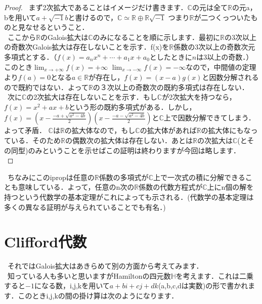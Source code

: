 \documentclass[./main]{subfiles} %
\theoremstyle{idefinition}
\begin{document}
\begin{proof}
\ まず2次拡大であることはイメージだけ書きます．$\mathbb{C}$の元は全て$\mathbb{R}$の元a，bを用いて$a+\sqrt{-1} b$と書けるので，$\mathbb{C} \simeq \mathbb{R} \oplus \mathbb{R} \sqrt{-1}$ つまり$\mathbb{R}$が二つくっついたものと見なせるということ．\\
\ ここから$\mathbb{R}$のGalois拡大は$\mathbb{C}$のみになることを順に示します．最初に$\mathbb{R}$の3次以上の奇数次Galois拡大は存在しないことを示す．f(x)を$\mathbb{R}$係数の3次以上の奇数次元多項式とする．（$f(x)=a_nx^n+\cdots +a_1x+a_0$としたときに$n$は3以上の奇数．）このとき$\displaystyle \lim_{x \to +\infty} f(x)=+\infty$ $\displaystyle \lim_{x \to -\infty} f(x)=-\infty$なので，中間値の定理より$f(a)=0$となる$a\in \mathbb{R}$が存在し，$f(x)=(x-a)g(x)$と因数分解されるので既約ではない．よって$\mathbb{R}$の３次以上の奇数次の既約多項式は存在しない．\\
\ 次に$\mathbb{C}$の2次拡大は存在しないことを示す．もし$\mathbb{C}$が2次拡大を持つなら，$f(x)=x^2+ax+b$という形の既約多項式がある．しかし，$f(x)=(x-\frac{-a+\sqrt{a^2-4b}}{2})(x-\frac{-a-\sqrt{a^2-4b}}{2})$と$\mathbb{C}$上で因数分解できてしまう．よって矛盾． $\mathbb{C}$は$\mathbb{R}$の拡大体なので，もし$\mathbb{C}$の拡大体があれば$\mathbb{R}$の拡大体にもなっている．そのため$\mathbb{R}$の偶数次の拡大体は存在しない．あとは$\mathbb{R}$の次拡大は$\mathbb{C}$(とその同型)のみということを示せばこの証明は終わりますが今回は略します．\\
\end{proof}

\ ちなみにこのipropは任意の$\mathbb{R}$係数の多項式が$\mathbb{C}$上で一次式の積に分解できることも意味している．よって，任意のn次の$\mathbb{R}$係数の代数方程式が$\mathbb{C}$上にn個の解を持つという代数学の基本定理がこれによっても示される．(代数学の基本定理は多くの異なる証明が与えられていることでも有名．)\\


\newpage

\section{Clifford代数}

\ それではGalois拡大はあきらめて別の方面から考えてみます．\\
\ 知っている人も多いと思いますがHamiltonの四元数$\mathbb{H}$を考えます．これは二乗すると$-1$になる数，i,j,kを用いて$a+bi+cj+dk$(a,b,c,dは実数)の形で書かれます．このときi,j,kの間の掛け算は次のようになります．\\
\end{document}
